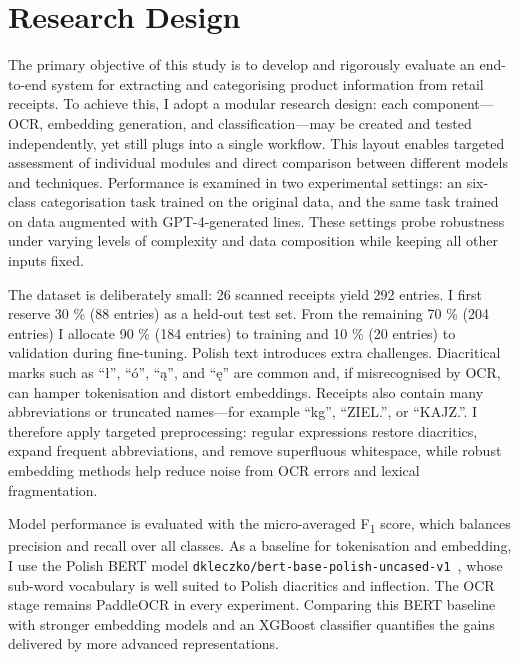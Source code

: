 \documentclass{SGGW-thesis-EN}
\begin{document}
\section{Research Design}
The primary objective of this study is to develop and rigorously evaluate an end-to-end system for extracting and
categorising product information from retail receipts.  To achieve this, I adopt a modular research design: each
component—OCR, embedding generation, and classification—may be created and tested independently, yet still plugs into a
single workflow.  This layout enables targeted assessment of individual modules and direct comparison between different
models and techniques.  Performance is examined in two experimental settings: an six-class categorisation task trained
on the original data, and the same task trained on data augmented with GPT-4-generated lines.
These settings probe robustness under varying levels of complexity and data composition while keeping all other inputs
fixed.

The dataset is deliberately small: 26 scanned receipts yield 292 entries.  I first reserve 30 \% (88 entries)
as a held-out test set.  From the remaining 70 \% (204 entries) I allocate 90 \% (184 entries) to training and 10 \%
(20 entries) to validation during fine-tuning.
Polish text introduces extra challenges.  Diacritical marks such as “ł”, “ó”, “ą”, and “ę” are common and, if
misrecognised by OCR, can hamper tokenisation and distort embeddings.  Receipts also contain many abbreviations or
truncated names—for example “kg”, “ZIEL.”, or “KAJZ.”.  I therefore apply targeted preprocessing: regular expressions
restore diacritics, expand frequent abbreviations, and remove superfluous whitespace, while robust embedding methods
help reduce noise from OCR errors and lexical fragmentation.

Model performance is evaluated with the micro-averaged F\textsubscript{1} score, which balances precision and recall
over all classes.  As a baseline for tokenisation and embedding, I use the Polish BERT model
\texttt{dkleczko/bert-base-polish-uncased-v1}~\cite{kleczek2020polbert},
whose sub-word vocabulary is well suited to Polish diacritics and inflection.  The OCR stage remains PaddleOCR in every
experiment. Comparing this BERT baseline with stronger embedding models and an XGBoost classifier quantifies the gains delivered by more advanced
representations.
\end{document}
